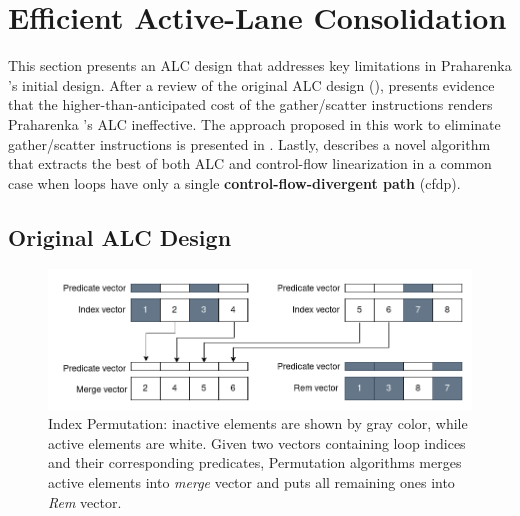 \newpage
\chapter{Efficient Active-Lane Consolidation}
\label{chap:approach}


This section presents an ALC design that addresses key limitations in Praharenka \etal's initial design\cite{praharenka_vectorizing_2022}. After a review of the original ALC design (),  presents evidence that the higher-than-anticipated cost of the gather/scatter instructions renders Praharenka \etal's ALC ineffective.
The approach proposed in this work to eliminate gather/scatter instructions is presented in .
Lastly,  describes a novel algorithm that extracts the best of both ALC and control-flow linearization in a common case when loops have only a single \textbf{control-flow-divergent path} (\acrshort{cfdp}).

\section{Original ALC Design}
\label{sec:original-alc}

\begin{figure}[t]
\includegraphics[width=\textwidth]{Figures/03-approach/Permutation.png}
\centering
\caption{Index Permutation: inactive elements are shown by gray color, while active elements are white. Given two vectors containing loop indices and their corresponding predicates, Permutation algorithms merges active elements into \emph{merge} vector and puts all remaining ones into \emph{Rem} vector.}
\label{fig:permutation}
\end{figure}


